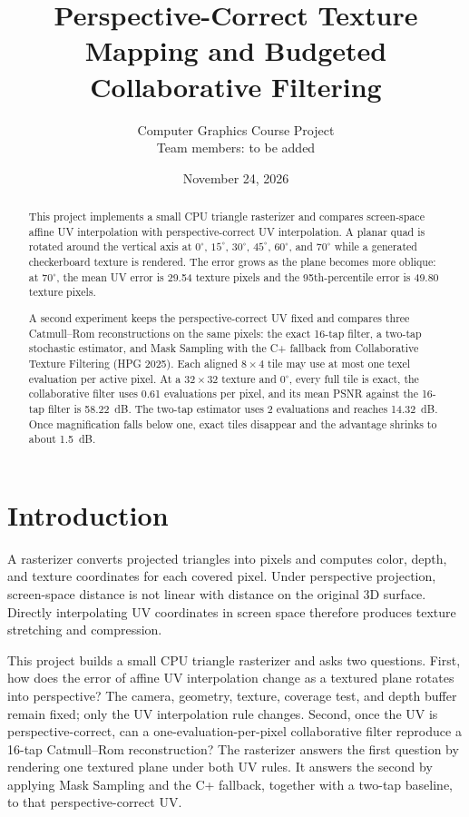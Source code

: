 \documentclass[a4paper,11pt]{article}
\title{Perspective-Correct Texture Mapping and Budgeted Collaborative Filtering}
\author{Computer Graphics Course Project\\Team members: to be added}
\date{November 24, 2026}
\begin{document}
\maketitle

\begin{abstract}
This project implements a small CPU triangle rasterizer and compares screen-space affine UV interpolation with perspective-correct UV interpolation. A planar quad is rotated around the vertical axis at $0^\circ$, $15^\circ$, $30^\circ$, $45^\circ$, $60^\circ$, and $70^\circ$ while a generated checkerboard texture is rendered. The error grows as the plane becomes more oblique: at $70^\circ$, the mean UV error is 29.54 texture pixels and the 95th-percentile error is 49.80 texture pixels.

A second experiment keeps the perspective-correct UV fixed and compares three Catmull--Rom reconstructions on the same pixels: the exact 16-tap filter, a two-tap stochastic estimator, and Mask Sampling with the C+ fallback from Collaborative Texture Filtering (HPG 2025). Each aligned $8\times4$ tile may use at most one texel evaluation per active pixel. At a $32\times32$ texture and $0^\circ$, every full tile is exact, the collaborative filter uses 0.61 evaluations per pixel, and its mean PSNR against the 16-tap filter is 58.22~dB. The two-tap estimator uses 2 evaluations and reaches 14.32~dB. Once magnification falls below one, exact tiles disappear and the advantage shrinks to about 1.5~dB.
\end{abstract}

\section{Introduction}
A rasterizer converts projected triangles into pixels and computes color, depth, and texture coordinates for each covered pixel. Under perspective projection, screen-space distance is not linear with distance on the original 3D surface. Directly interpolating UV coordinates in screen space therefore produces texture stretching and compression.

This project builds a small CPU triangle rasterizer and asks two questions. First, how does the error of affine UV interpolation change as a textured plane rotates into perspective? The camera, geometry, texture, coverage test, and depth buffer remain fixed; only the UV interpolation rule changes. Second, once the UV is perspective-correct, can a one-evaluation-per-pixel collaborative filter reproduce a 16-tap Catmull--Rom reconstruction? The rasterizer answers the first question by rendering one textured plane under both UV rules. It answers the second by applying Mask Sampling and the C+ fallback, together with a two-tap baseline, to that perspective-correct UV.
\end{document}
